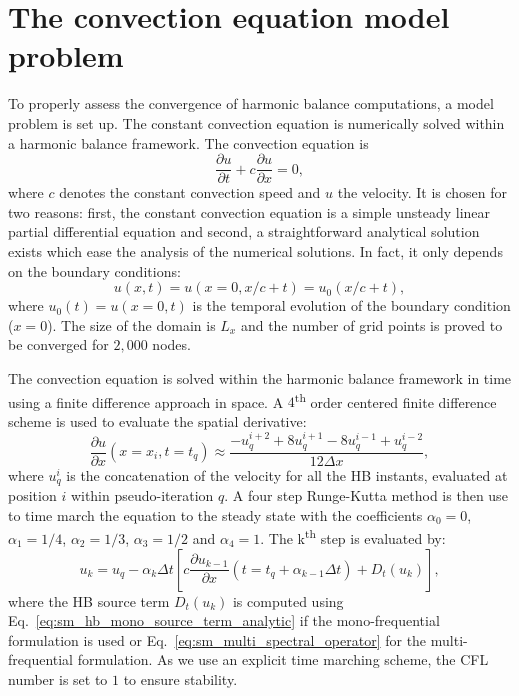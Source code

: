 
\section{The convection equation model problem}

To properly assess the convergence of harmonic balance computations,
a model problem is set up. The constant convection 
equation is numerically solved within a harmonic balance 
framework. The convection equation is
\begin{equation}
  \label{eq:convection}
  \frac{\partial u}{\partial t} + c \frac{\partial u}{\partial x} = 0,
\end{equation}
where $c$ denotes the constant convection speed and $u$ the velocity. 
It is chosen for two reasons: first, the constant
convection equation is a simple unsteady 
linear partial differential equation
and second, a straightforward analytical solution
exists
which ease the analysis of the numerical solutions. In fact,
it only depends on the boundary conditions:
\begin{equation}
  \label{eq:solconvanalytic}
    u(x, t) = u(x=0, x/c + t) = u_0 (x/c + t),
\end{equation}
where $u_0(t) = u(x=0, t)$ is the temporal evolution of 
the boundary condition ($x=0$). 
The size of the domain is $L_x$ and the number of grid points is
proved to be converged for $2,000$ nodes.

The convection equation is solved within the harmonic
balance framework in time using a finite difference approach
in space.
A $4$\textsuperscript{th} order centered finite
difference scheme is used to evaluate the spatial derivative:
\begin{equation}
    \frac{\partial u}{\partial x} (x = x_i, t=t_q) \approx 
    \frac{-u^{i+2}_{q} + 8 u^{i+1}_{q} - 8 u^{i-1}_{q} + u^{i-2}_{q}}{12\Delta x},
    \label{eq:convection_center4}
\end{equation}
where $u_q^i$ is the concatenation of the velocity for  
all the HB instants,
evaluated at position $i$ within pseudo-iteration $q$.
A four step Runge-Kutta method is then use to time 
march the equation to the steady state with the coefficients $\alpha_0 = 0$,
$\alpha_1 = 1/4$, $\alpha_2 = 1/3$, $\alpha_3 = 1/2$ and $\alpha_4 = 1$.
The k\textsuperscript{th} step is evaluated by:
\begin{equation}
    u_k = u_q - \alpha_k \Delta t \left [ 
          c \frac{\partial u_{k-1}}{\partial x} (t=t_q + \alpha_{k-1} \Delta t)
          + D_t(u_k)
          \right],
    \label{eq:convection_rk4}
\end{equation}
where the HB source term $D_t(u_k)$ is computed using 
Eq.~\eqref{eq:sm_hb_mono_source_term_analytic} if the mono-frequential
formulation is used or Eq.~\eqref{eq:sm_multi_spectral_operator}
for the multi-frequential formulation.
As we use 
an explicit time marching scheme, the CFL number is set to $1$ to ensure stability.

